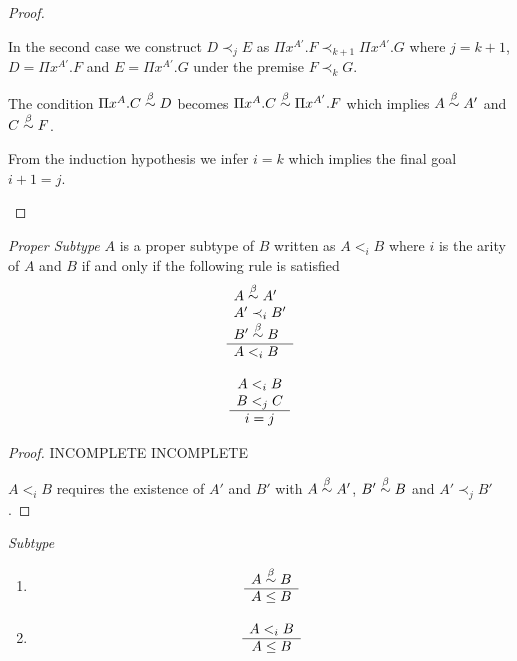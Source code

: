 \begin{lemma}
\begin{proof}
\begin{enumerate}
        In the second case we construct $D \prec_j E$ as
        $\Pi x^{A'}. F \prec_{k+1} \Pi x^{A'}. G$ where $j = k + 1$,
        $D = \Pi x^{A'}. F$ and $E = \Pi x^{A'}. G$
        under the premise $F \prec_k G$.

        The condition $\Pi x^A. C \stackrel{\beta}{\sim} D$ becomes $\Pi x^A.C \stackrel{\beta}{\sim} \Pi
        x^{A'}. F$ which implies $A \stackrel{\beta}{\sim} A'$ and $C \stackrel{\beta}{\sim} F$.

        From the induction hypothesis we infer $i = k$ which implies the final
        goal $i + 1 = j$.
        \end{enumerate}
    \end{proof}
\end{lemma}








\begin{definition}
    \emph{Proper Subtype}
    $A$ is a proper subtype of $B$ written as $A <_i B$ where $i$ is the arity
    of $A$ and $B$ if and only if the
    following rule is satisfied
    $$
    \begin{array}{l} 
        A \stackrel{\beta}{\sim} A'
        \\
        A' \prec_i B'
        \\
        B' \stackrel{\beta}{\sim} B
     \\ \hline 
        A <_i B
    \end{array}
    $$
\end{definition}


\begin{lemma}
    \label{ProperSubtypeSameArity}
    $$
    \begin{array}{c} A <_i B \\ B <_j C \\ \hline i = j\end{array}
    $$
    \begin{proof}
        INCOMPLETE INCOMPLETE

        $A <_i B$ requires the existence of $A'$ and $B'$ with $A \stackrel{\beta}{\sim} A'$,
        $B' \stackrel{\beta}{\sim} B$ and $A' \prec_j B'$.
    \end{proof}
\end{lemma}



\begin{definition}
    \emph{Subtype}
    \begin{enumerate}
    \item
        $$
        \begin{array}{c} 
            A \stackrel{\beta}{\sim} B
         \\ \hline 
            A \le B
        \end{array}
        $$

    \item
        $$
        \begin{array}{c} 
            A <_i B
         \\ \hline 
            A \le B
        \end{array}
        $$
    \end{enumerate}
\end{definition}












